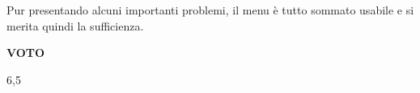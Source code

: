 Pur presentando alcuni importanti problemi, il menu è tutto sommato usabile e si merita quindi la sufficienza.
\begin{center}
\begin{Large}
\textbf{VOTO}\\
\vspace{0.1cm}
\end{Large}
\begin{huge}
6,5
\end{huge}
\end{center}
